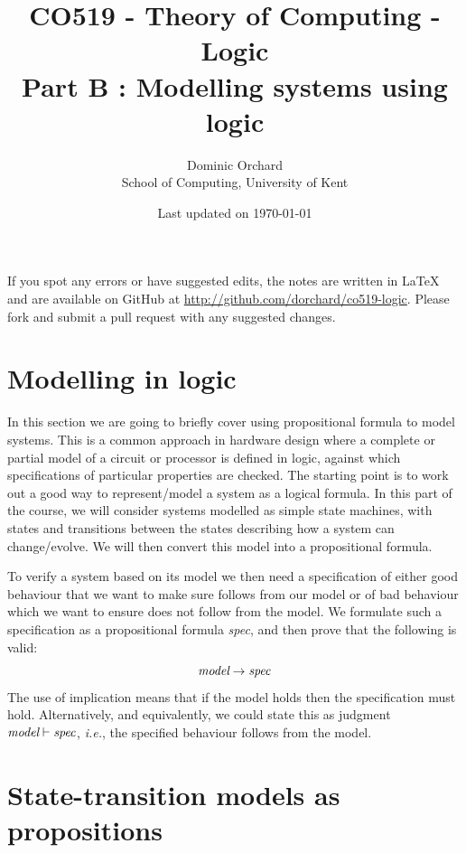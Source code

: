\documentclass{article}
\title{\vspace{-3em}CO519 - Theory of Computing - Logic \\
  {\large{Part B : Modelling systems using logic}}}
\author{Dominic Orchard \\
  {\small{School of Computing, University of Kent}}}
\date{Last updated on \today}
\theoremstyle{definition}
\newcommand{\ie}{\emph{i.e.}}
\begin{document}
\maketitle

\noindent
If you spot any errors or have suggested edits, the notes are written
in LaTeX and are available on GitHub at
\url{http://github.com/dorchard/co519-logic}. Please fork and submit a
pull request with any suggested changes.

\newcommand{\atomr}{\textsf{r}}
\newcommand{\atomrp}{\textsf{r'}}
\newcommand{\atomg}{\textsf{g}}
\newcommand{\atomgp}{\textsf{g'}}

\section{Modelling in logic}

In this section we are going to briefly cover using propositional
formula to model systems. This is a common approach in hardware design
where a complete or partial model of a circuit or processor is defined in logic,
against which specifications of particular properties are checked.
The starting point is to work out a good way to represent/model a
system as a logical formula. In this part of the course, we will
consider systems modelled as simple state machines, with states and
transitions between the states describing how a system can
change/evolve. We will then convert this model into a propositional
formula.

To verify a system based on its model we then need a specification of
either good behaviour that we want to make sure follows from our model
or of bad behaviour which we want to ensure does not follow from the
model.  We formulate such a specification as a propositional formula
\emph{spec}, and then prove that the following is valid:
%
\begin{equation*}
\emph{model} \rightarrow \emph{spec}
\end{equation*}
%
The use of implication means that if the model holds then
the specification must hold. Alternatively, and equivalently,
we could state this as judgment $\emph{model} \vdash \emph{spec}$,
\ie{}, the specified behaviour follows from the model.

\section{State-transition models as propositions}
\end{document}
